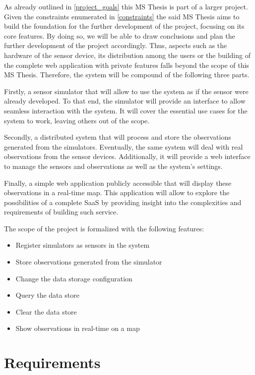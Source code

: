 As already outlined in \ref{project_goals} this MS Thesis is part of a larger project. Given the constraints enumerated in \ref{constraints} the said MS Thesis aims to build the foundation for the further development of the project, focusing on its core features. By doing so, we will be able to draw conclusions and plan the further development of the project accordingly. Thus, aspects such as the hardware of the sensor device, its distribution among the users or the building of the complete web application with private features falls beyond the scope of this MS Thesis. Therefore, the system will be compound of the following three parts. 

Firstly, a sensor simulator that will allow to use the system as if the sensor were already developed. To that end, the simulator will provide an interface to allow seamless interaction with the system. It will cover the essential use cases for the system to work, leaving others out of the scope.

Secondly, a distributed system that will process and store the observations generated from the simulators. Eventually, the same system will deal with real observations from the sensor devices. Additionally, it will provide a web interface to manage the sensors and observations as well as the system's settings.

Finally, a simple web application publicly accessible that will display these observations in a real-time map. This application will allow to explore the possibilities of a complete SaaS by providing insight into the complexities and requirements of building such service.

The scope of the project is formalized with the following features:

\begin{itemize}
\item Register simulators as sensors in the system
\item Store observations generated from the simulator
\item Change the data storage configuration
\item Query the data store
\item Clear the data store
\item Show observations in real-time on a map
\end{itemize}

\section{Requirements}

